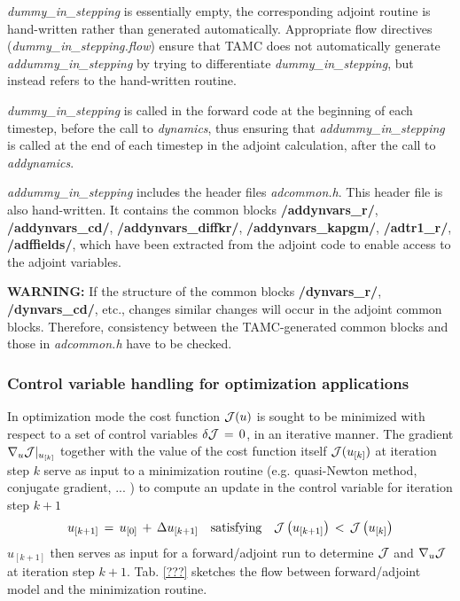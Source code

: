 \begin{itemize}
{\it dummy\_in\_stepping} is essentially empty,
the corresponding adjoint routine is hand-written rather
than generated automatically.
Appropriate flow directives ({\it dummy\_in\_stepping.flow})
ensure that TAMC does not automatically 
generate {\it addummy\_in\_stepping} by trying to differentiate
{\it dummy\_in\_stepping}, but instead refers to 
the hand-written routine.

{\it dummy\_in\_stepping} is called in the forward code
at the beginning of each
timestep, before the call to {\it dynamics}, thus ensuring
that {\it addummy\_in\_stepping} is called at the end of
each timestep in the adjoint calculation, after the call to
{\it addynamics}.

{\it addummy\_in\_stepping} includes the header files
{\it adcommon.h}.
This header file is also hand-written. It contains
the common blocks 
{\bf /addynvars\_r/}, {\bf /addynvars\_cd/},
{\bf /addynvars\_diffkr/}, {\bf /addynvars\_kapgm/},
{\bf /adtr1\_r/}, {\bf /adffields/},
which have been extracted from the adjoint code to enable
access to the adjoint variables.

{\bf WARNING:} If the structure of the common blocks
{\bf /dynvars\_r/}, {\bf /dynvars\_cd/}, etc., changes
similar changes will occur in the adjoint common blocks.
Therefore, consistency between the TAMC-generated common blocks
and those in {\it adcommon.h} have to be checked.
%
\end{itemize}


\subsubsection{Control variable handling for 
optimization applications}

In optimization mode the cost function $ {\cal J}(u) $ is sought
to be minimized with respect to a set of control variables
$ \delta {\cal J} \, = \, 0 $, in an iterative manner.
The gradient $ \nabla _{u}{\cal J} |_{u_{[k]}} $ together
with the value of the cost function itself $ {\cal J}(u_{[k]}) $ 
at iteration step $ k $ serve
as input to a minimization routine (e.g. quasi-Newton method,
conjugate gradient, ... \cite{gil-lem:89}) 
to compute an update in the
control variable for iteration step $k+1$
\[
u_{[k+1]} \, = \,  u_{[0]} \, + \, \Delta u_{[k+1]}
\quad \mbox{satisfying} \quad
 {\cal J} \left( u_{[k+1]} \right) \, < \, {\cal J} \left( u_{[k]} \right)
\]
$ u_{[k+1]} $ then serves as input for a forward/adjoint run
to determine $ {\cal J} $ and $ \nabla _{u}{\cal J} $ at iteration step
$ k+1 $.
Tab. \ref{???} sketches the flow between forward/adjoint model
and the minimization routine.

